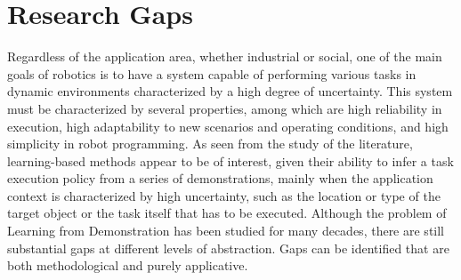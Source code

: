 \section{Research Gaps}
\label{sec:research_gaps}
Regardless of the application area, whether industrial or social, one of the main goals of robotics is to have a system capable of performing various tasks in dynamic environments characterized by a high degree of uncertainty. This system must be characterized by several properties, among which are high reliability in execution, high adaptability to new scenarios and operating conditions, and high simplicity in robot programming. As seen from the study of the literature, learning-based methods appear to be of interest, given their ability to infer a task execution policy from a series of demonstrations, mainly when the application context is characterized by high uncertainty, such as the location or type of the target object or the task itself that has to be executed. Although the problem of Learning from Demonstration has been studied for many decades, there are still substantial gaps at different levels of abstraction. Gaps can be identified that are both methodological and purely applicative.

